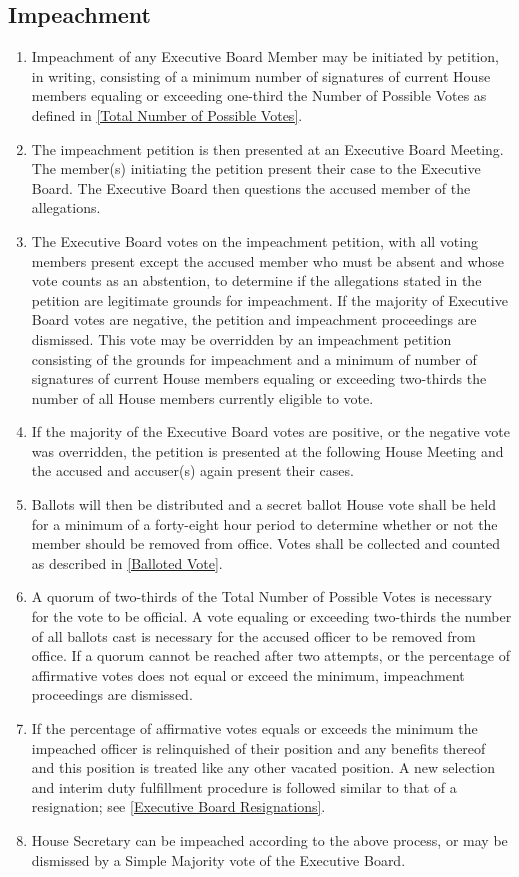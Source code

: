 \documentclass{article}
\newcommand{\asection}[1]{\subsection{#1} \label{#1}}
\begin{document}
\asection{Impeachment}
\begin{enumerate}
	\item Impeachment of any Executive Board Member may be initiated by petition, in writing, consisting of a minimum number of signatures of current House members equaling or exceeding one-third the Number of Possible Votes as defined in \ref{Total Number of Possible Votes}.
	\item The impeachment petition is then presented at an Executive Board Meeting.
		The member(s) initiating the petition present their case to the Executive Board.
		The Executive Board then questions the accused member of the allegations.
	\item The Executive Board votes on the impeachment petition, with all voting members present except the accused member who must be absent and whose vote counts as an abstention, to determine if the allegations stated in the petition are legitimate grounds for impeachment.
		If the majority of Executive Board votes are negative, the petition and impeachment proceedings are dismissed.
		This vote may be overridden by an impeachment petition consisting of the grounds for impeachment and a minimum of number of signatures of current House members equaling or exceeding two-thirds the number of all House members currently eligible to vote.
	\item If the majority of the Executive Board votes are positive, or the negative vote was overridden, the petition is presented at the following House Meeting and the accused and accuser(s) again present their cases.
	\item Ballots will then be distributed and a secret ballot House vote shall be held for a minimum of a forty-eight hour period to determine whether or not the member should be removed from office.
		Votes shall be collected and counted as described in \ref{Balloted Vote}.
	\item A quorum of two-thirds of the Total Number of Possible Votes is necessary for the vote to be official.
		A vote equaling or exceeding two-thirds the number of all ballots cast is necessary for the accused officer to be removed from office.
		If a quorum cannot be reached after two attempts, or the percentage of affirmative votes does not equal or exceed the minimum, impeachment proceedings are dismissed.
	\item If the percentage of affirmative votes equals or exceeds the minimum the impeached officer is relinquished of their position and any benefits thereof and this position is treated like any other vacated position.
		A new selection and interim duty fulfillment procedure is followed similar to that of a resignation; see \ref{Executive Board Resignations}.
	\item House Secretary can be impeached according to the above process, or may be dismissed by a Simple Majority vote of the Executive Board.
\end{enumerate}
\end{document}
